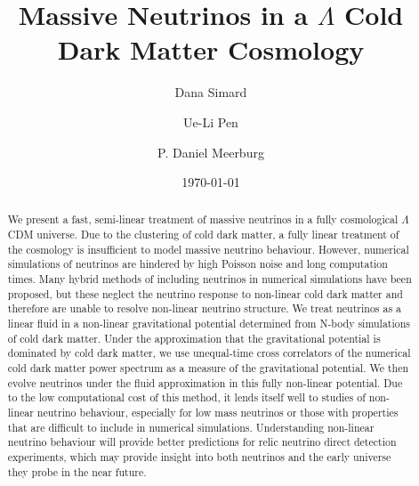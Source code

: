 \documentclass[twocolumn,superscriptaddress,prd]{revtex4}
\begin{document}
\title{Massive Neutrinos in a $\Lambda$ Cold Dark Matter Cosmology}
\date{\today}

\author{ Dana Simard }

\author{ Ue-Li Pen }

\author{P. Daniel Meerburg}

\begin{abstract}
We present a fast, semi-linear treatment of massive
neutrinos in a fully cosmological $\Lambda$CDM universe.
Due to the clustering of cold dark matter, a fully linear
treatment of the cosmology is insufficient to model massive neutrino
behaviour.  
However, numerical simulations of neutrinos are hindered
by high Poisson noise and long computation times.
Many hybrid methods of including neutrinos in numerical
simulations have been proposed, but these neglect the neutrino
response to non-linear cold dark matter %
and therefore are unable to
resolve non-linear neutrino structure. 
We treat neutrinos as a linear fluid in a non-linear gravitational
potential determined from N-body simulations of cold dark matter.
Under the approximation that the gravitational potential is dominated
by cold dark matter, we use unequal-time cross correlators of the
numerical cold dark matter power
spectrum as a measure of the gravitational potential. 
We then evolve neutrinos under the fluid approximation 
in this fully non-linear potential.
Due to the low computational cost of this method, it lends itself well
to studies of non-linear neutrino behaviour, especially for low mass
neutrinos or those with properties that are difficult to
include in numerical simulations.  Understanding non-linear neutrino
behaviour will provide better predictions for relic neutrino
direct detection experiments, 
which may provide insight into both 
neutrinos and the early universe they probe in the near future.
\end{abstract}
\end{document}
